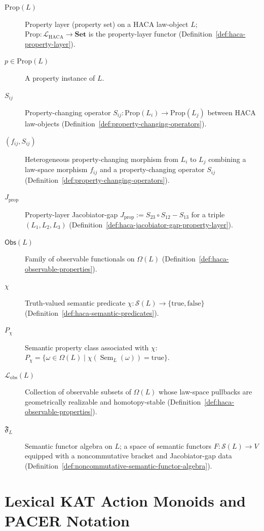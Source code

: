 \documentclass[11pt]{book}
\theoremstyle{plain}
\theoremstyle{definition}
\theoremstyle{remark}
\begin{document}
\begin{description}
  \item[$\mathrm{Prop}(L)$] Property layer (property set) on a HACA
        law-object $L$; $\mathrm{Prop}:\mathcal{L}_{\mathrm{HACA}}\to
        \mathbf{Set}$ is the property-layer functor
        (Definition~\ref{def:haca-property-layer}).
  \item[$p\in\mathrm{Prop}(L)$] A property instance of $L$.
  \item[$S_{ij}$] Property-changing operator $S_{ij}:\mathrm{Prop}(L_i)
        \to\mathrm{Prop}(L_j)$ between HACA law-objects
        (Definition~\ref{def:property-changing-operators}).
  \item[$(f_{ij},S_{ij})$] Heterogeneous property-changing morphism
        from $L_i$ to $L_j$ combining a law-space morphism $f_{ij}$ and
        a property-changing operator $S_{ij}$
        (Definition~\ref{def:property-changing-operators}).
  \item[$J_{\mathrm{prop}}$] Property-layer Jacobiator-gap
        \(
          J_{\mathrm{prop}}:=S_{23}\circ S_{12}-S_{13}
        \)
        for a triple $(L_1,L_2,L_3)$
        (Definition~\ref{def:haca-jacobiator-gap-property-layer}).
  \item[$\mathsf{Obs}(L)$] Family of observable functionals on
        $\Omega(L)$ (Definition~\ref{def:haca-observable-properties}).
  \item[$\chi$] Truth-valued semantic predicate
        $\chi:\mathcal{S}(L)\to\{\mathrm{true},\mathrm{false}\}$
        (Definition~\ref{def:haca-semantic-predicates}).
  \item[$P_\chi$] Semantic property class associated with $\chi$:
        $P_\chi=\{\omega\in\Omega(L)\mid
        \chi(\operatorname{Sem}_L(\omega))=\mathrm{true}\}$.
  \item[$\mathcal{L}_{\mathrm{obs}}(L)$] Collection of observable
        subsets of $\Omega(L)$ whose law-space pullbacks are
        geometrically realizable and homotopy-stable
        (Definition~\ref{def:haca-observable-properties}).
  \item[$\mathfrak{F}_L$] Semantic functor algebra on $L$; a space of
        semantic functors $F:\mathcal{S}(L)\to V$ equipped with a
        noncommutative bracket and Jacobiator-gap data
        (Definition~\ref{def:noncommutative-semantic-functor-algebra}).
\end{description}

\section*{Lexical KAT Action Monoids and PACER Notation}
\end{document}
